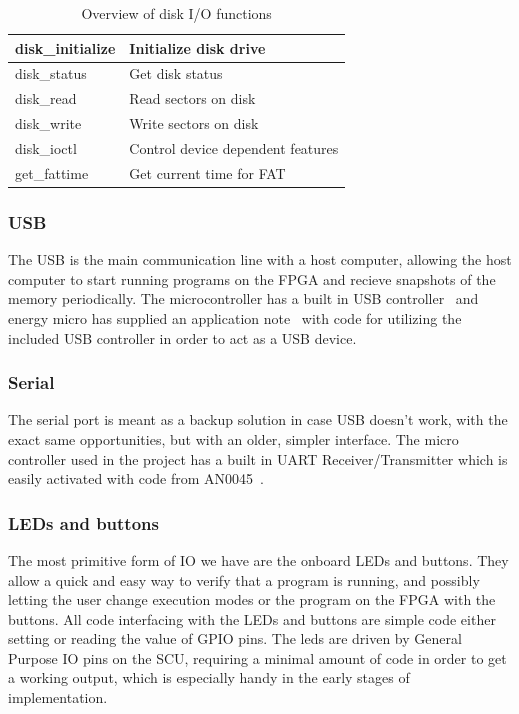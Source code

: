 \begin{table}
    \begin{tabular}{| l | l |}
        \hline
        disk\_initialize & Initialize disk drive \\
        \hline
        disk\_status & Get disk status \\
        \hline
        disk\_read & Read sectors on disk \\
        \hline
        disk\_write & Write sectors on disk \\
        \hline
        disk\_ioctl & Control device dependent features \\
        \hline
        get\_fattime & Get current time for FAT \\
        \hline
    \end{tabular}
    \caption{Overview of disk I/O functions}
\end{table}

\subsubsection{USB}
The USB is the main communication line with a host computer, allowing the host computer to start running programs on the FPGA and recieve snapshots of the memory periodically.
The microcontroller has a built in USB controller~\cite{efm32gg990-datasheet} and energy micro has supplied an application note~\cite{an0065} with code for utilizing the included USB controller in order to act as a USB device.

\subsubsection{Serial}
The serial port is meant as a backup solution in case USB doesn't work, with the exact same opportunities, but with an older, simpler interface.
The micro controller used in the project has a built in UART Receiver/Transmitter\cite{efm32gg990-datasheet} which is easily activated with code from AN0045~\cite{an0045}.

\subsubsection{LEDs and buttons}
The most primitive form of IO we have are the onboard LEDs and buttons.
They allow a quick and easy way to verify that a program is running, and possibly letting the user change execution modes or the program on the FPGA with the buttons.
All code interfacing with the LEDs and buttons are simple code either setting or reading the value of GPIO pins.
The leds are driven by General Purpose IO pins on the SCU, requiring a minimal amount of code in order to get a working output, which is especially handy in the early stages of implementation.

